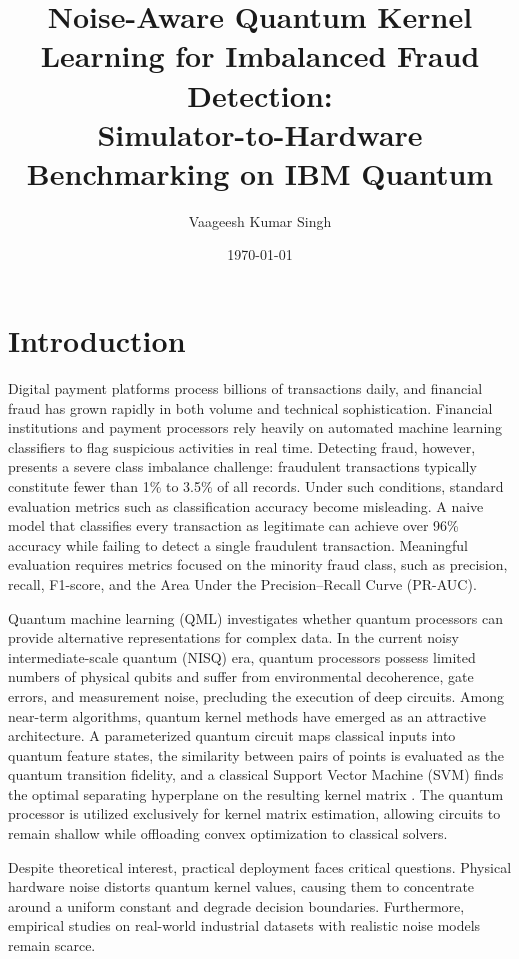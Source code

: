 \documentclass[12pt,a4paper]{article}
\title{\textbf{Noise-Aware Quantum Kernel Learning for Imbalanced Fraud Detection: \\ Simulator-to-Hardware Benchmarking on IBM Quantum}}
\author{Vaageesh Kumar Singh}
\date{\today}
\begin{document}
\maketitle

\section{Introduction}

Digital payment platforms process billions of transactions daily, and financial fraud has grown rapidly in both volume and technical sophistication. Financial institutions and payment processors rely heavily on automated machine learning classifiers to flag suspicious activities in real time. Detecting fraud, however, presents a severe class imbalance challenge: fraudulent transactions typically constitute fewer than 1\% to 3.5\% of all records. Under such conditions, standard evaluation metrics such as classification accuracy become misleading. A naive model that classifies every transaction as legitimate can achieve over 96\% accuracy while failing to detect a single fraudulent transaction. Meaningful evaluation requires metrics focused on the minority fraud class, such as precision, recall, F1-score, and the Area Under the Precision--Recall Curve (PR-AUC).

Quantum machine learning (QML) investigates whether quantum processors can provide alternative representations for complex data. In the current noisy intermediate-scale quantum (NISQ) era, quantum processors possess limited numbers of physical qubits and suffer from environmental decoherence, gate errors, and measurement noise, precluding the execution of deep circuits. Among near-term algorithms, quantum kernel methods have emerged as an attractive architecture. A parameterized quantum circuit maps classical inputs into quantum feature states, the similarity between pairs of points is evaluated as the quantum transition fidelity, and a classical Support Vector Machine (SVM) finds the optimal separating hyperplane on the resulting kernel matrix \cite{havlicek2019,schuld2019}. The quantum processor is utilized exclusively for kernel matrix estimation, allowing circuits to remain shallow while offloading convex optimization to classical solvers.

Despite theoretical interest, practical deployment faces critical questions. Physical hardware noise distorts quantum kernel values, causing them to concentrate around a uniform constant and degrade decision boundaries. Furthermore, empirical studies on real-world industrial datasets with realistic noise models remain scarce.
\end{document}
